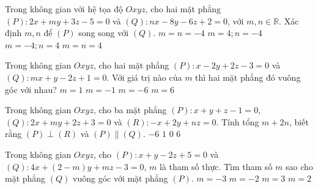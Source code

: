 \begin{ex}%
	Trong không gian với hệ tọa độ $Oxyz$, cho hai mặt phẳng $(P)\colon 2x+my+3z-5=0$ và $(Q)\colon nx-8y-6z+2=0$, với $m,n\in \mathbb{R}$. Xác định $m,n$ để $(P)$ song song với $(Q)$.
	\choice
	{$m=n=-4$}
	{\True $m=4;n=-4$}
	{$m=- 4;n=4$}
	{$m=n=4$}
\end{ex}

\begin{ex}%
	Trong không gian $Oxyz$, cho hai mặt phẳng $(P)\colon x-2y+2z-3=0$ và $(Q)\colon mx+y-2z+1=0$. Với giá trị nào của $m$ thì hai mặt phẳng đó vuông góc với nhau?
	\choice
	{$m=1$}
	{$m=-1$}
	{$m=-6$}
	{\True $m=6$}
\end{ex}

\begin{ex}%
	Trong không gian $Oxyz$, cho ba mặt phẳng $(P)\colon x+y+z-1=0$, $(Q)\colon 2x+my+2z+3=0$ và $(R)\colon -x+2y+nz=0$. Tính tổng $m+2n$, biết rằng $(P)\perp (R)$ và $(P)\parallel (Q)$.
	\choice
	{$-6$}
	{$1$}
	{\True $0$}
	{$6$}
\end{ex}

\begin{ex}%
	Trong không gian $Oxyz$, cho $(P)\colon x+y-2z+5=0$ và $(Q)\colon 4x+(2-m)y+mz-3=0$, $m$ là tham số thực. Tìm tham số $m$ sao cho mặt phẳng $(Q)$ vuông góc với mặt phẳng $(P)$.
	\choice
	{$m=-3$}
	{$m=-2$}
	{$m=3$}
	{\True $m=2$}
\end{ex}

